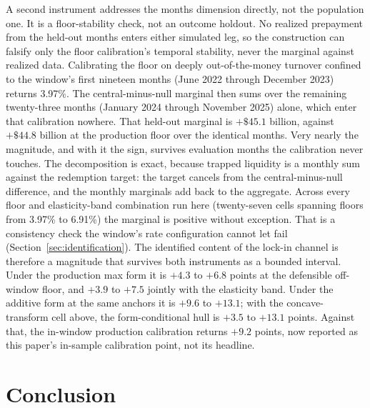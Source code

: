 \documentclass[12pt]{article}
\begin{document}
A second instrument addresses the months dimension directly, not the population one. It is a floor-stability check, not an outcome holdout. No realized prepayment from the held-out months enters either simulated leg, so the construction can falsify only the floor calibration's temporal stability, never the marginal against realized data. Calibrating the floor on deeply out-of-the-money turnover confined to the window's first nineteen months (June 2022 through December 2023) returns 3.97\%. The central-minus-null marginal then sums over the remaining twenty-three months (January 2024 through November 2025) alone, which enter that calibration nowhere. That held-out marginal is $+\$45.1$ billion, against $+\$44.8$ billion at the production floor over the identical months. Very nearly the magnitude, and with it the sign, survives evaluation months the calibration never touches. The decomposition is exact, because trapped liquidity is a monthly sum against the redemption target: the target cancels from the central-minus-null difference, and the monthly marginals add back to the aggregate. Across every floor and elasticity-band combination run here (twenty-seven cells spanning floors from 3.97\% to 6.91\%) the marginal is positive without exception. That is a consistency check the window's rate configuration cannot let fail (Section~\ref{sec:identification}). The identified content of the lock-in channel is therefore a magnitude that survives both instruments as a bounded interval. Under the production max form it is $+4.3$ to $+6.8$ points at the defensible off-window floor, and $+3.9$ to $+7.5$ jointly with the elasticity band. Under the additive form at the same anchors it is $+9.6$ to $+13.1$; with the concave-transform cell above, the form-conditional hull is $+3.5$ to $+13.1$ points. Against that, the in-window production calibration returns $+9.2$ points, now reported as this paper's in-sample calibration point, not its headline.


\section{Conclusion}\label{sec:conclusion}
\end{document}
